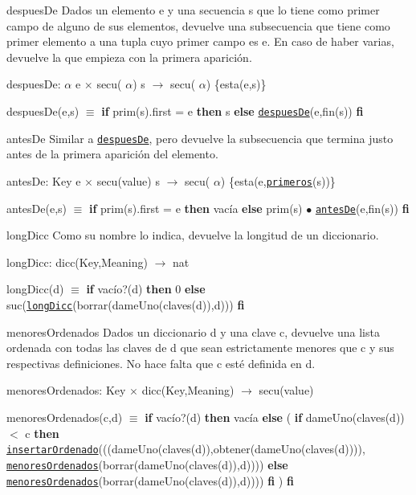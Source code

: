 \begin{DoxyParagraph}{despues\-De}
Dados un elemento e y una secuencia s que lo tiene como primer campo de alguno de sus elementos, devuelve una subsecuencia que tiene como primer elemento a una tupla cuyo primer campo es e. En caso de haber varias, devuelve la que empieza con la primera aparición.

despues\-De\-:  $\alpha$ e $\times$ secu( $\alpha$) s $\to$ secu( $\alpha$) \{esta(e,s)\} \par
 despues\-De(e,s) $\equiv$ {\bfseries if} prim(s).first = e {\bfseries then} s {\bfseries else} \href{axiomas.html#despuesDe}{\tt despues\-De}(e,fin(s)) {\bfseries fi} 


\end{DoxyParagraph}
\begin{DoxyParagraph}{antes\-De}
Similar a \href{axiomas.html#despuesDe}{\tt despues\-De}, pero devuelve la subsecuencia que termina justo antes de la primera aparición del elemento.

antes\-De\-: Key e $\times$ secu(value) s $\to$ secu( $\alpha$) \{esta(e,\href{axiomas.html#primeros}{\tt primeros}(s))\} \par
 antes\-De(e,s) $\equiv$ {\bfseries if} prim(s).first = e {\bfseries then} vacía {\bfseries else} prim(s) $\bullet$ \href{axiomas.html#antesDe}{\tt antes\-De}(e,fin(s)) {\bfseries fi} 


\end{DoxyParagraph}
\begin{DoxyParagraph}{long\-Dicc}
Como su nombre lo indica, devuelve la longitud de un diccionario.

long\-Dicc\-: dicc(\-Key,\-Meaning) $\to$ nat \par
 long\-Dicc(d) $\equiv$ {\bfseries if} vacío?(d) {\bfseries then} 0 {\bfseries else} suc(\href{axiomas.html#longDicc}{\tt long\-Dicc}(borrar(dame\-Uno(claves(d)),d))) {\bfseries fi} 


\end{DoxyParagraph}
\begin{DoxyParagraph}{menores\-Ordenados}
Dados un diccionario d y una clave c, devuelve una lista ordenada con todas las claves de d que sean estrictamente menores que c y sus respectivas definiciones. No hace falta que c esté definida en d.

menores\-Ordenados\-: Key $\times$ dicc(\-Key,\-Meaning) $\to$ secu(value) \par
 menores\-Ordenados(c,d) $\equiv$ {\bfseries if} vacío?(d) {\bfseries then} vacía {\bfseries else} ( {\bfseries if} dame\-Uno(claves(d)) $<$ c {\bfseries then} \href{axiomas.html#insertarOrdenado}{\tt insertar\-Ordenado}(((dame\-Uno(claves(d)),obtener(dame\-Uno(claves(d)))), \href{axiomas.html#menoresOrdenados}{\tt menores\-Ordenados}(borrar(dame\-Uno(claves(d)),d)))) {\bfseries else} \href{axiomas.html#menoresOrdenados}{\tt menores\-Ordenados}(borrar(dame\-Uno(claves(d)),d)))) {\bfseries fi} ) {\bfseries fi} 


\end{DoxyParagraph}
